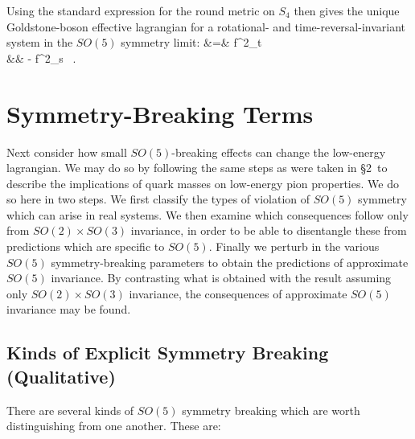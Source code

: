 \documentclass[12pt]{report}
\begin{document}
Using the standard expression for the round metric on $S_4$
then gives the unique Goldstone-boson effective lagrangian
for a rotational- and time-reversal-invariant system in the
$SO(5)$ symmetry limit:
%
\bg
\label{kintermanglesinv}
\Scl &=& {f^2_t }  \nn\\
&& \qquad \qquad - \;  {f^2_s } \;  \, .\nn
\nd

\section{Symmetry-Breaking Terms}

Next consider how small $SO(5)$-breaking effects can change
the low-energy lagrangian. We may do so by following the
same steps as were taken in \S2\ to describe the
implications of quark masses on low-energy pion properties.
We do so here in two steps. We first classify the types of
violation of $SO(5)$ symmetry which can arise in real
systems. We then examine which consequences follow only
from $SO(2) \times SO(3)$ invariance, in order to be able
to disentangle these from predictions which are specific to
$SO(5)$. Finally we perturb in the various $SO(5)$
symmetry-breaking parameters to obtain the predictions of
approximate $SO(5)$ invariance. By contrasting what is
obtained with the result assuming only $SO(2) \times SO(3)$
invariance, the consequences of approximate $SO(5)$
invariance may be found.

\subsection{Kinds of Explicit Symmetry Breaking
(Qualitative)}

There are several kinds of $SO(5)$ symmetry breaking which
are worth distinguishing from one another. These are:
\end{document}
